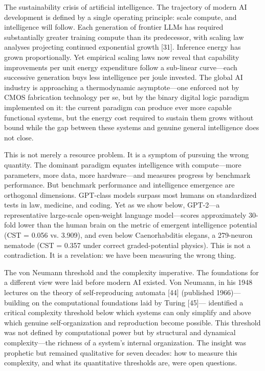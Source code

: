 \documentclass[a4paper,12pt]{article}
\begin{document}
The sustainability crisis of artificial intelligence. The trajectory of modern AI development is defined by a single operating principle: scale compute, and intelligence will follow. Each generation of frontier LLMs has required substantially greater training compute than its predecessor, with scaling law analyses projecting continued exponential growth [31]. Inference energy has grown proportionally. Yet empirical scaling laws now reveal that capability improvements per unit energy expenditure follow a sub-linear curve---each successive generation buys less intelligence per joule invested. The global AI industry is approaching a thermodynamic asymptote---one enforced not by CMOS fabrication technology per se, but by the binary digital logic paradigm implemented on it: the current paradigm can produce ever more capable functional systems, but the energy cost required to sustain them grows without bound while the gap between these systems and genuine general intelligence does not close.


This is not merely a resource problem. It is a symptom of pursuing the wrong quantity. The dominant paradigm equates intelligence with compute---more parameters, more data, more hardware---and measures progress by benchmark performance. But benchmark performance and intelligence emergence are orthogonal dimensions. GPT-class models surpass most humans on standardized tests in law, medicine, and coding. Yet as we show below, GPT-2---a representative large-scale open-weight language model---scores approximately 30-fold lower than the human brain on the metric of emergent intelligence potential (CST = 0.056 vs. 3.909), and even below Caenorhabditis elegans, a 279-neuron nematode (CST = 0.357 under correct graded-potential physics). This is not a contradiction. It is a revelation: we have been measuring the wrong thing.


The von Neumann threshold and the complexity imperative. The foundations for a different view were laid before modern AI existed. Von Neumann, in his 1948 lectures on the theory of self-reproducing automata [44] (published 1966)---building on the computational foundations laid by Turing [45]--- identified a critical complexity threshold below which systems can only simplify and above which genuine self-organization and reproduction become possible. This threshold was not defined by computational power but by structural and dynamical complexity---the richness of a system's internal organization. The insight was prophetic but remained qualitative for seven decades: how to measure this complexity, and what its quantitative thresholds are, were open questions.
\end{document}
